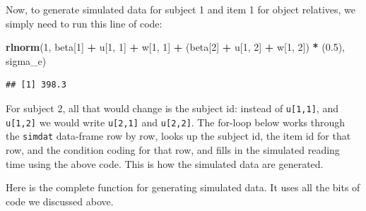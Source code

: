 \documentclass[12pt,]{krantz}
\newenvironment{Shaded}{\begin{snugshade}}{\end{snugshade}}
\newcommand{\DecValTok}[1]{\textcolor[rgb]{0.00,0.00,0.81}{#1}}
\newcommand{\FloatTok}[1]{\textcolor[rgb]{0.00,0.00,0.81}{#1}}
\newcommand{\KeywordTok}[1]{\textcolor[rgb]{0.13,0.29,0.53}{\textbf{#1}}}
\newcommand{\NormalTok}[1]{#1}
\newcommand{\OperatorTok}[1]{\textcolor[rgb]{0.81,0.36,0.00}{\textbf{#1}}}
\newcommand{\StringTok}[1]{\textcolor[rgb]{0.31,0.60,0.02}{#1}}
\begin{document}
Now, to generate simulated data for subject 1 and item 1 for object relatives, we simply need to run this line of code:

\begin{Shaded}
\begin{Highlighting}[]
\KeywordTok{rlnorm}\NormalTok{(}\DecValTok{1}\NormalTok{, beta[}\DecValTok{1}\NormalTok{] }\OperatorTok{+}\StringTok{ }\NormalTok{u[}\DecValTok{1}\NormalTok{, }\DecValTok{1}\NormalTok{] }\OperatorTok{+}\StringTok{ }\NormalTok{w[}\DecValTok{1}\NormalTok{, }\DecValTok{1}\NormalTok{] }\OperatorTok{+}\StringTok{ }\NormalTok{(beta[}\DecValTok{2}\NormalTok{] }\OperatorTok{+}\StringTok{ }
\StringTok{  }\NormalTok{u[}\DecValTok{1}\NormalTok{, }\DecValTok{2}\NormalTok{] }\OperatorTok{+}\StringTok{ }\NormalTok{w[}\DecValTok{1}\NormalTok{, }\DecValTok{2}\NormalTok{]) }\OperatorTok{*}\StringTok{ }\NormalTok{(}\FloatTok{0.5}\NormalTok{), sigma_e)}
\end{Highlighting}
\end{Shaded}

\begin{verbatim}
## [1] 398.3
\end{verbatim}

For subject 2, all that would change is the subject id: instead of \texttt{u{[}1,1{]}}, and \texttt{u{[}1,2{]}} we would write \texttt{u{[}2,1{]}} and \texttt{u{[}2,2{]}}. The for-loop below works through the \texttt{simdat} data-frame row by row, looks up the subject id, the item id for that row, and the condition coding for that row, and fills in the simulated reading time using the above code. This is how the simulated data are generated.

Here is the complete function for generating simulated data. It uses all the bits of code we discussed above.
\end{document}
